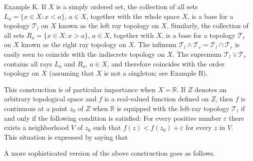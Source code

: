 Example K. If $X$ is a simply ordered set, the collection of all sets $L_a = \{x \in X : x < a\}$, $a \in X$, together with the whole space $X$, is a base for a topology $\mathcal{T}_l$ on $X$ known as the left ray topology on $X$. Similarly, the collection of all sets $R_a = \{x \in X : x > a\}$, $a \in X$, together with $X$, is a base for a topology $\mathcal{T}_r$ on $X$ known as the right ray topology on $X$. The infimum $\mathcal{T}_l \wedge \mathcal{T}_r = \mathcal{T}_l \cap \mathcal{T}_r$ is easily seen to coincide with the indiscrete topology on $X$. The supremum $\mathcal{T}_l \vee \mathcal{T}_r$ contains all rays $L_a$ and $R_a$, $a \in X$, and therefore coincides with the order topology on $X$ (assuming that $X$ is not a singleton; see Example B).

This construction is of particular importance when $X = \mathbb{R}$. If $Z$ denotes an arbitrary topological space and $f$ is a real-valued function defined on $Z$, then $f$ is continuous at a point $z_0$ of $Z$ when $\mathbb{R}$ is equipped with the left-ray topology $\mathcal{T}_l$ if and only if the following condition is satisfied: For every positive number $\varepsilon$ there exists a neighborhood $V$ of $z_0$ such that $f(z) < f(z_0) + \varepsilon$ for every $z$ in $V$. This situation is expressed by saying that

A more sophisticated version of the above construction goes as follows.
